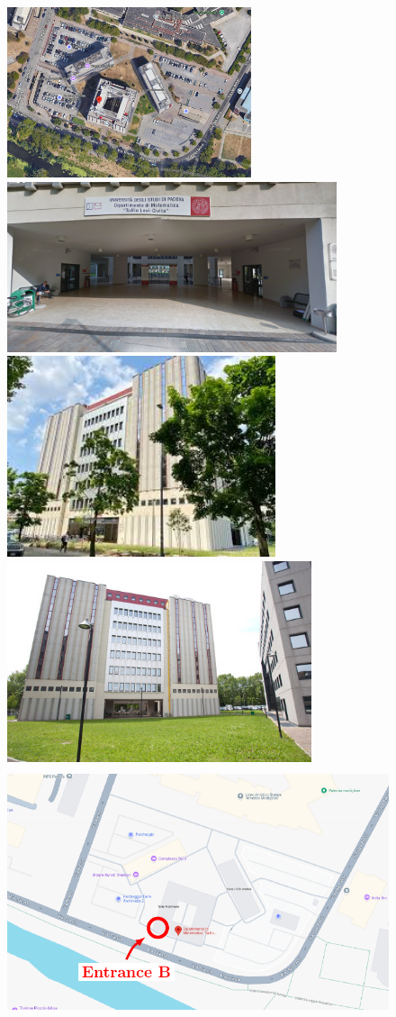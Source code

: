 \documentclass{article}
\begin{document}
\begin{figure}[h]\centering
   \includegraphics[height=50mm]{figures/google-maps-torre-archimede-1.png}
   \includegraphics[height=50mm]{figures/google-maps-torre-archimede-2.png}
   \includegraphics[height=59mm]{figures/torre-archimede-1.jpeg}
   \includegraphics[height=59mm]{figures/torre-archimede-2.jpg}
   \includegraphics[height=74mm, trim={15mm 0mm 10mm 10mm}, clip]{figures/google-maps-torre-archimede-4.pdf}
\end{figure}
\end{document}
